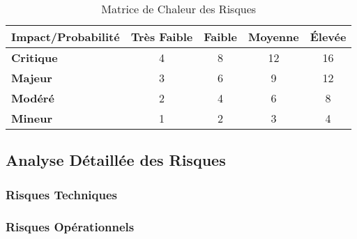 \begin{table}[H]
\centering
\caption{Matrice de Chaleur des Risques}
\label{tab:risk-heatmap}
\begin{tabular}{|l|c|c|c|c|}
\hline
\rowcolor{DollaramaGreen!30}
\textbf{\color{white}Impact/Probabilité} & 
\textbf{\color{white}Très Faible} & 
\textbf{\color{white}Faible} & 
\textbf{\color{white}Moyenne} & 
\textbf{\color{white}Élevée} \\
\hline
\textbf{Critique} & \cellcolor{yellow!50}4 & \cellcolor{orange!50}8 & \cellcolor{red!50}12 & \cellcolor{red!70}16 \\
\hline
\textbf{Majeur} & \cellcolor{green!50}3 & \cellcolor{yellow!50}6 & \cellcolor{orange!50}9 & \cellcolor{red!50}12 \\
\hline
\textbf{Modéré} & \cellcolor{green!30}2 & \cellcolor{green!50}4 & \cellcolor{yellow!50}6 & \cellcolor{orange!50}8 \\
\hline
\textbf{Mineur} & \cellcolor{green!20}1 & \cellcolor{green!30}2 & \cellcolor{green!50}3 & \cellcolor{yellow!50}4 \\
\hline
\end{tabular}
\end{table}

\subsection{Analyse Détaillée des Risques}

\subsubsection{Risques Techniques}


\subsubsection{Risques Opérationnels}


